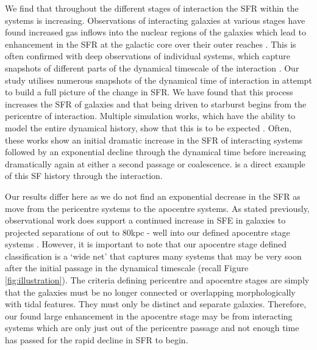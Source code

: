 We find that throughout the different stages of interaction the SFR within the systems is increasing. Observations of interacting galaxies at various stages have found increased gas inflows into the nuclear regions of the galaxies which lead to enhancement in the SFR at the galactic core over their outer reaches \citep{2015A&A...579A..45B}. This is often confirmed with deep observations of individual systems, which capture snapshots of different parts of the dynamical timescale of the interaction \citep{2022MNRAS.514.2769K}. Our study utilises numerous snapshots of the dynamical time of interaction in attempt to build a full picture of the change in SFR. We have found that this process increases the SFR of galaxies and that being driven to starburst begins from the pericentre of interaction. Multiple simulation works, which have the ability to model the entire dynamical history, show that this is to be expected \citep{2007A&A...468...61D, 2013MNRAS.430.1901H, 2015MNRAS.452.2984K, 2021MNRAS.503.3113M}. Often, these works show an initial dramatic increase in the SFR of interacting systems followed by an exponential decline through the dynamical time before increasing dramatically again at either a second passage or coalescence. \citet{2015MNRAS.448.1107M} is a direct example of this SF history through the interaction.

Our results differ here as we do not find an exponential decrease in the SFR as move from the pericentre systems to the apocentre systems. As stated previously, observational work does support a continued increase in SFE in galaxies to projected separations of out to 80kpc - well into our defined apocentre stage systems \citep[for further examples, see][]{2008MNRAS.385.1903L, 2012MNRAS.426..549S}. However, it is important to note that our apocentre stage defined classification is a `wide net' that captures many systems that may be very soon after the initial passage in the dynamical timescale (recall Figure \ref{fig:illustration}). The criteria defining pericentre and apocentre stages are simply that the galaxies must be no longer connected or overlapping morphologically with tidal features. They must only be distinct and separate galaxies. Therefore, our found large enhancement in the apocentre stage may be from interacting systems which are only just out of the pericentre passage and not enough time has passed for the rapid decline in SFR to begin. 

